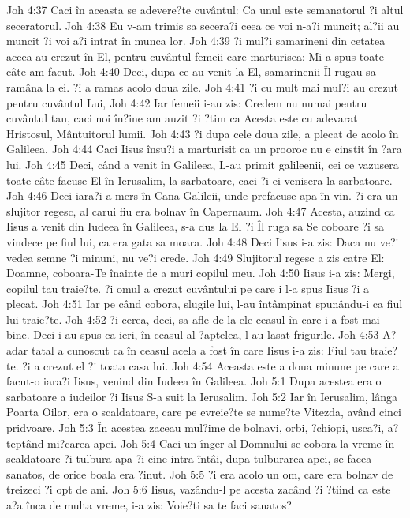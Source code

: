 Joh 4:37  Caci în aceasta se adevere?te cuvântul: Ca unul este semanatorul ?i altul seceratorul.
Joh 4:38  Eu v-am trimis sa secera?i ceea ce voi n-a?i muncit; al?ii au muncit ?i voi a?i intrat în munca lor.
Joh 4:39  ?i mul?i samarineni din cetatea aceea au crezut în El, pentru cuvântul femeii care marturisea: Mi-a spus toate câte am facut.
Joh 4:40  Deci, dupa ce au venit la El, samarinenii Îl rugau sa ramâna la ei. ?i a ramas acolo doua zile.
Joh 4:41  ?i cu mult mai mul?i au crezut pentru cuvântul Lui,
Joh 4:42  Iar femeii i-au zis: Credem nu numai pentru cuvântul tau, caci noi în?ine am auzit ?i ?tim ca Acesta este cu adevarat Hristosul, Mântuitorul lumii.
Joh 4:43  ?i dupa cele doua zile, a plecat de acolo în Galileea.
Joh 4:44  Caci Iisus însu?i a marturisit ca un prooroc nu e cinstit în ?ara lui.
Joh 4:45  Deci, când a venit în Galileea, L-au primit galileenii, cei ce vazusera toate câte facuse El în Ierusalim, la sarbatoare, caci ?i ei venisera la sarbatoare.
Joh 4:46  Deci iara?i a mers în Cana Galileii, unde prefacuse apa în vin. ?i era un slujitor regesc, al carui fiu era bolnav în Capernaum.
Joh 4:47  Acesta, auzind ca Iisus a venit din Iudeea în Galileea, s-a dus la El ?i Îl ruga sa Se coboare ?i sa vindece pe fiul lui, ca era gata sa moara.
Joh 4:48  Deci Iisus i-a zis: Daca nu ve?i vedea semne ?i minuni, nu ve?i crede.
Joh 4:49  Slujitorul regesc a zis catre El: Doamne, coboara-Te înainte de a muri copilul meu.
Joh 4:50  Iisus i-a zis: Mergi, copilul tau traie?te. ?i omul a crezut cuvântului pe care i l-a spus Iisus ?i a plecat.
Joh 4:51  Iar pe când cobora, slugile lui, l-au întâmpinat spunându-i ca fiul lui traie?te.
Joh 4:52  ?i cerea, deci, sa afle de la ele ceasul în care i-a fost mai bine. Deci i-au spus ca ieri, în ceasul al ?aptelea, l-au lasat frigurile.
Joh 4:53  A?adar tatal a cunoscut ca în ceasul acela a fost în care Iisus i-a zis: Fiul tau traie?te. ?i a crezut el ?i toata casa lui.
Joh 4:54  Aceasta este a doua minune pe care a facut-o iara?i Iisus, venind din Iudeea în Galileea.
Joh 5:1  Dupa acestea era o sarbatoare a iudeilor ?i Iisus S-a suit la Ierusalim.
Joh 5:2  Iar în Ierusalim, lânga Poarta Oilor, era o scaldatoare, care pe evreie?te se nume?te Vitezda, având cinci pridvoare.
Joh 5:3  În acestea zaceau mul?ime de bolnavi, orbi, ?chiopi, usca?i, a?teptând mi?carea apei.
Joh 5:4  Caci un înger al Domnului se cobora la vreme în scaldatoare ?i tulbura apa ?i cine intra întâi, dupa tulburarea apei, se facea sanatos, de orice boala era ?inut.
Joh 5:5  ?i era acolo un om, care era bolnav de treizeci ?i opt de ani.
Joh 5:6  Iisus, vazându-l pe acesta zacând ?i ?tiind ca este a?a înca de multa vreme, i-a zis: Voie?ti sa te faci sanatos?
